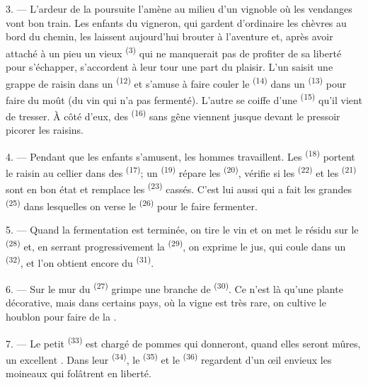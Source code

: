 3. --- L'ardeur de la poursuite l'amène au milieu d'un vignoble où les vendanges
vont bon train. Les enfants du vigneron, qui gardent d'ordinaire les chèvres au
bord du chemin, les laissent aujourd'hui brouter à l'aventure et, après avoir
attaché à un pieu un vieux  \textsuperscript{(3)} qui ne manquerait
pas de profiter de sa liberté pour s'échapper, s'accordent à leur tour une part
du plaisir. L'un saisit une grappe de raisin dans un 
\textsuperscript{(12)} et s'amuse à faire couler le 
\textsuperscript{(14)} dans un  \textsuperscript{(13)} pour
faire du moût (du vin qui n'a pas fermenté). L'autre se coiffe d'une
 \textsuperscript{(15)} qu'il vient de tresser. À
côté d'eux, des  \textsuperscript{(16)} sans gêne viennent
jusque devant le pressoir picorer les raisins.

4. --- Pendant que les enfants s'amusent, les hommes travaillent. Les
 \textsuperscript{(18)} portent le raisin au cellier dans
des  \textsuperscript{(17)}; un 
\textsuperscript{(19)} répare les  \textsuperscript{(20)},
vérifie si les  \textsuperscript{(22)} et les 
\textsuperscript{(21)} sont en bon état et remplace les 
\textsuperscript{(23)} cassés. C'est lui aussi qui a fait les grandes
 \textsuperscript{(25)} dans lesquelles on verse le
 \textsuperscript{(26)} pour le faire fermenter.

5. --- Quand la fermentation est terminée, on tire le vin et on met le résidu
sur le  \textsuperscript{(28)} et, en serrant progressivement
la  \textsuperscript{(29)}, on exprime le jus, qui coule dans un
 \textsuperscript{(32)}, et l'on obtient encore du 
\textsuperscript{(31)}.

\VUsaut{6.0mm}
\VUsaut{3.4mm}

6. --- Sur le mur du  \textsuperscript{(27)} grimpe une branche
de  \textsuperscript{(30)}. Ce n'est là qu'une plante
décorative, mais dans certains pays, où la vigne est très rare, on cultive le
houblon pour faire de la .

7. --- Le petit  \textsuperscript{(33)} est chargé de pommes qui
donneront, quand elles seront mûres, un excellent . Dans leur
 \textsuperscript{(34)}, le  \textsuperscript{(35)}
et le  \textsuperscript{(36)} regardent d'un œil envieux
les moineaux qui folâtrent en liberté.

